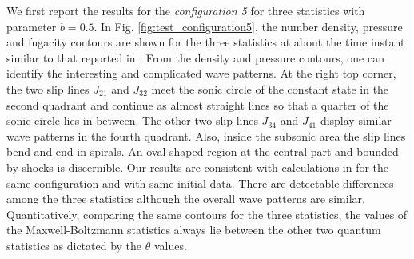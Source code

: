 \documentclass{rsproca}%
\begin{document}
We first report the results for the \emph{configuration 5} for three statistics with parameter $b=0.5$.
In Fig. \ref{fig:test_configuration5}, the number density, pressure and fugacity contours are shown for the three statistics at about the time instant similar to that reported in \cite{Laxliu95}\cite{schultzrinne}.   From the density and pressure contours, one can identify the interesting and complicated wave patterns.   At the right top corner, the two slip lines $J_{21}$ and $J_{32}$ meet the sonic circle of the constant state in the second quadrant and continue as almost straight lines so that a quarter of the sonic circle lies in between.  The other two slip lines $J_{34}$ and $J_{41}$ display similar wave patterns in the fourth quadrant.  Also, inside the subsonic area the slip lines bend and end in spirals.  An oval shaped region at the central part and bounded by shocks is discernible. Our results are consistent with calculations in \cite{Laxliu95}\cite{schultzrinne} for the same configuration and with same initial data.   There are detectable differences among the three statistics although the overall wave patterns are similar.  Quantitatively, comparing the same contours for the three statistics, the values of the Maxwell-Boltzmann statistics always lie between the other two quantum statistics as dictated by the $\theta$ values.
\end{document}
